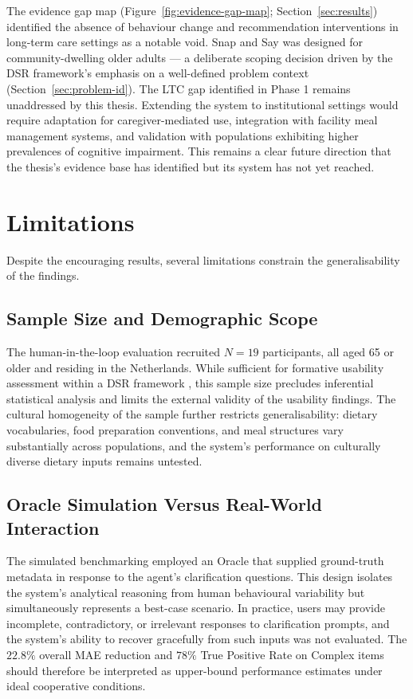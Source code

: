 The evidence gap map (Figure~\ref{fig:evidence-gap-map}; Section~\ref{sec:results}) identified the absence of behaviour change and recommendation interventions in long-term care settings as a notable void. Snap and Say was designed for community-dwelling older adults --- a deliberate scoping decision driven by the DSR framework's emphasis on a well-defined problem context (Section~\ref{sec:problem-id}). The LTC gap identified in Phase 1 remains unaddressed by this thesis. Extending the system to institutional settings would require adaptation for caregiver-mediated use, integration with facility meal management systems, and validation with populations exhibiting higher prevalences of cognitive impairment. This remains a clear future direction that the thesis's evidence base has identified but its system has not yet reached.

\section{Limitations}
\label{sec:limitations}

Despite the encouraging results, several limitations constrain the generalisability of the findings.

\subsection{Sample Size and Demographic Scope}

The human-in-the-loop evaluation recruited $N=19$ participants, all aged 65 or older and residing in the Netherlands. While sufficient for formative usability assessment within a DSR framework \citep{venableFEDSFrameworkEvaluation2016}, this sample size precludes inferential statistical analysis and limits the external validity of the usability findings. The cultural homogeneity of the sample further restricts generalisability: dietary vocabularies, food preparation conventions, and meal structures vary substantially across populations, and the system's performance on culturally diverse dietary inputs remains untested.

\subsection{Oracle Simulation Versus Real-World Interaction}

The simulated benchmarking employed an Oracle that supplied ground-truth metadata in response to the agent's clarification questions. This design isolates the system's analytical reasoning from human behavioural variability but simultaneously represents a best-case scenario. In practice, users may provide incomplete, contradictory, or irrelevant responses to clarification prompts, and the system's ability to recover gracefully from such inputs was not evaluated. The $22.8\%$ overall MAE reduction and $78\%$ True Positive Rate on Complex items should therefore be interpreted as upper-bound performance estimates under ideal cooperative conditions.

